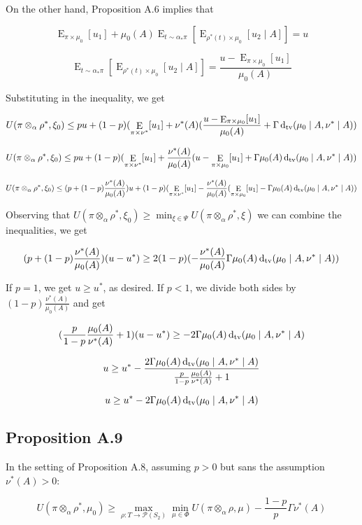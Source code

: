 \documentclass[a4paper]{article}
\DeclareMathOperator{\E}{E}
\newcommand{\Dtv}{\operatorname{d}_{\textnormal{tv}}}
\newcommand{\Prob}{\mathcal{P}}
\begin{document}
On the other hand, Proposition A.6 implies that

$$\E_{\pi \times \mu_0}[u_1] + \mu_0(A)\E_{t \sim \alpha_* \pi}[\E_{\rho^*(t) \times \mu_0}[u_2 \mid A]] = u$$

$$\E_{t \sim \alpha_* \pi}[\E_{\rho^*(t) \times \mu_0}[u_2 \mid A]] = \frac{u-\E_{\pi \times \mu_0}[u_1]}{\mu_0(A)}$$

Substituting in the inequality, we get

$$U(\pi \otimes_\alpha \rho^*, \xi_0) \leq pu + (1-p) (\E_{\pi \times \nu^*}[u_1] + \nu^*(A)(\frac{u-\E_{\pi \times \mu_0}[u_1]}{\mu_0(A)}+\Gamma \Dtv(\mu_0 \mid A, \nu^* \mid A))$$

$$U(\pi \otimes_\alpha \rho^*, \xi_0) \leq pu + (1-p) (\E_{\pi \times \nu^*}[u_1] + \frac{\nu^*(A)}{\mu_0(A)}(u-\E_{\pi \times \mu_0}[u_1]+\Gamma \mu_0(A) \Dtv(\mu_0 \mid A, \nu^* \mid A))$$

$$U(\pi \otimes_\alpha \rho^*, \xi_0) \leq (p + (1-p)\frac{\nu^*(A)}{\mu_0(A)})u + (1-p) (\E_{\pi \times \nu^*}[u_1] - \frac{\nu^*(A)}{\mu_0(A)}(\E_{\pi \times \mu_0}[u_1]-\Gamma \mu_0(A) \Dtv(\mu_0 \mid A, \nu^* \mid A))$$

Observing that ${U(\pi \otimes_\alpha \rho^*, \xi_0) \geq \min_{\xi \in \Psi} U(\pi \otimes_\alpha \rho^*, \xi)}$ we can combine the inequalities, we get

$$(p + (1-p)\frac{\nu^*(A)}{\mu_0(A)})(u-u^*)\geq 2 (1-p) ( - \frac{\nu^*(A)}{\mu_0(A)}\Gamma\mu_0(A)\Dtv(\mu_0 \mid A, \nu^* \mid A))$$

If ${p = 1}$, we get ${u \geq u^*}$, as desired. If ${p < 1}$, we divide both sides by ${(1-p)\frac{\nu^*(A)}{\mu_0(A)}}$ and get

$$(\frac{p}{1-p}\frac{\mu_0(A)}{\nu^*(A)}+1)(u - u^*) \geq - 2\Gamma\mu_0(A)\Dtv(\mu_0 \mid A, \nu^* \mid A)$$

$$u \geq u^* - \frac{2\Gamma\mu_0(A)\Dtv(\mu_0 \mid A, \nu^* \mid A)}{\frac{p}{1-p}\frac{\mu_0(A)}{\nu^*(A)}+1}$$

$$u \geq u^* - 2\Gamma\mu_0(A)\Dtv(\mu_0 \mid A, \nu^* \mid A)$$

\subsection{Proposition A.9}

In the setting of Proposition A.8, assuming ${p > 0}$ but sans the assumption ${\nu^*(A) > 0}$:

$$U(\pi \otimes_\alpha \rho^*,\mu_0) \geq \max_{\rho: T \rightarrow \Prob(S_2)} \min_{\mu \in \Phi} U(\pi \otimes_\alpha \rho, \mu)-\frac{1-p}{p}\Gamma\nu^*(A)$$
\end{document}
